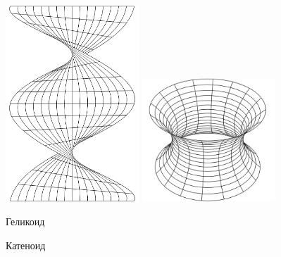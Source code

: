 \begin{figure}[H]
	\centering
	\begin{minipage}{.4\textwidth}
		\centering
		\includegraphics[width=5cm]{./img/Helicoid.pdf}
	\end{minipage}
	\begin{minipage}{.4\textwidth}
		\centering
		\includegraphics[width=5cm]{./img/Catenoid.pdf}
	\end{minipage}
	\vspace{.3cm}

	\begin{minipage}{.4\textwidth}
		\centering
		Геликоид
	\end{minipage}
	\begin{minipage}{.4\textwidth}
		\centering
		Катеноид
	\end{minipage}
	
	\caption[format=empty]{}
\end{figure}

